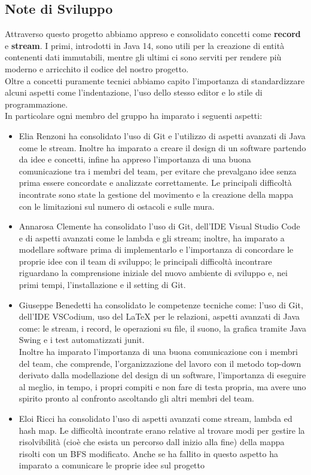 \documentclass[12pt, letterpaper]{article}
\begin{document}
    \subsection{Note di Sviluppo}
        Attraverso questo progetto abbiamo appreso e consolidato concetti come \textbf{record} e \textbf{stream}. I primi, introdotti in Java 14, sono utili per la creazione di entità contenenti dati immutabili, mentre gli ultimi ci sono serviti per rendere più moderno e arricchito il codice del nostro progetto. \\
        Oltre a concetti puramente tecnici abbiamo capito l'importanza di standardizzare alcuni aspetti come l'indentazione, l'uso dello stesso editor e lo stile di programmazione.\\
        In particolare ogni membro del gruppo ha imparato i seguenti aspetti:
        \begin{itemize}
            \item Elia Renzoni ha consolidato l'uso di Git e l'utilizzo di aspetti avanzati di Java come le stream. Inoltre ha imparato a creare il design di un software partendo da idee e concetti, infine ha appreso l'importanza di una buona comunicazione tra i membri del team, per evitare che prevalgano idee senza prima essere concordate e analizzate correttamente. Le principali difficoltà incontrate sono state la gestione del movimento e la creazione della mappa con le limitazioni sul numero di ostacoli e sulle mura.
            \item Annarosa Clemente ha consolidato l'uso di Git, dell'IDE Visual Studio Code e di aspetti avanzati come le lambda e gli stream; inoltre, ha imparato a modellare software prima di implementarlo e l'importanza di concordare le proprie idee con il team di sviluppo; le principali difficoltà incontrare riguardano la comprensione iniziale del nuovo ambiente di sviluppo e, nei primi tempi, l'installazione e il setting di Git.
            \item Giuseppe Benedetti ha consolidato le competenze tecniche come: l'uso di Git, dell'IDE VSCodium, uso del LaTeX per le relazioni, aspetti avanzati di Java come: le stream, i record, le operazioni su file, il suono, la grafica tramite Java Swing e i test automatizzati junit.\\
            Inoltre ha imparato l'importanza di una buona comunicazione con i membri del team, che comprende, l'organizzazione del lavoro con il metodo top-down derivato dalla modellazione del design di un software, l'importanza di eseguire al meglio, in tempo, i propri compiti e non fare di testa propria, ma avere uno spirito pronto al confronto ascoltando gli altri membri del team.  
            \item Eloi Ricci ha consolidato l'uso di aspetti avanzati come stream, lambda ed hash map. Le difficoltà incontrate erano relative al trovare modi per gestire la risolvibilità (cioè che esista un percorso dall inizio alla fine) della mappa risolti con un BFS modificato. Anche se ha fallito in questo aspetto ha imparato a comunicare le proprie idee sul progetto 
        \end{itemize}
\end{document}
